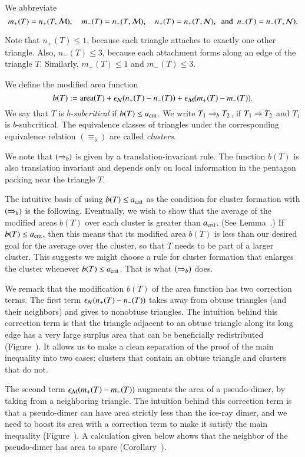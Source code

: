 We abbreviate 
\[
m_+(T) = n_+(T,\M), 
\quad m_-(T) = n_-(T,\M), 
\quad n_+(T) =n_+(T,\N), 
\ \text{ and } \ 
n_-(T) = n_-(T,\N).
\]

\begin{remark}
  Note  that $n_+(T)\le 1$, because each triangle attaches to
  exactly one other triangle.  Also, $n_-(T)\le 3$, because each
  attachment forms along an edge of the triangle $T$.  Similarly,
  $m_+(T)\le 1$ and $m_-(T)\le 3$.
\end{remark}


We define the modified area function
\begin{equation}
b(T) := {\operatorname{area}}(T) + \epsilon_{\mathcal N} (n_+(T) - n_-(T)) + \epsilon_{\mathcal M} (m_+(T) - m_-(T)).
\end{equation}
We say that $T$ is {\it $b$-subcritical} if $b(T) \le a_\text{crit}$.  We write
$T_1\Rightarrow_{b} T_2$, if $T_1\Rightarrow T_2$ and $T_1$ is $b$-subcritical.  The
equivalence classes of triangles under the corresponding equivalence
relation $(\equiv_b)$ are called {\it clusters}.

We note that $(\Rightarrow_{b})$ is given by a translation-invariant rule.  The
function $b(T)$ is also translation invariant and depends only on
local information in the pentagon packing near the triangle $T$.

The intuitive basis of using $b(T)\le a_\text{crit}$ as the condition for
cluster formation with $(\Rightarrow_{b})$ is the following.  Eventually, we wish
to show that the average of the modified areas $b(T)$ over each
cluster is greater than $a_\text{crit}$.  (See Lemma~.)  If
$b(T)\le a_\text{crit}$, then this means that its modified area $b(T)$ is less
than our desired goal  for the average over the cluster, so that
$T$ needs to be part of a larger cluster.  This suggests we might choose
a rule for cluster formation that enlarges the cluster whenever
$b(T)\le a_\text{crit}$. That is what $(\Rightarrow_{b})$ does.

We remark that the modification $b(T)$ of the area function has two
correction terms.  The first term $\epsilon_{\mathcal N} (n_+(T) - n_-(T))$ takes away
from obtuse triangles (and their neighbors) and gives to nonobtuse
triangles.  The intuition behind this correction term is that the
triangle adjacent to an obtuse triangle along its long edge has a very
large surplus area that can be beneficially redistributed
(Figure~).  It allows us to make a clean separation of
the proof of the main inequality into two cases: clusters that contain
an obtuse triangle and clusters that do not.

The second term $\epsilon_{\mathcal M} (m_+(T) - m_-(T))$ augments the area of a
pseudo-dimer, by taking from a neighboring triangle.  The intuition
behind this correction term is that a pseudo-dimer can have area
strictly less than the ice-ray dimer, and we need to boost its area
with a correction term to make it satisfy the main inequality
(Figure~).  A calculation given below shows that
the neighbor of the pseudo-dimer has area to spare
(Corollary~).

